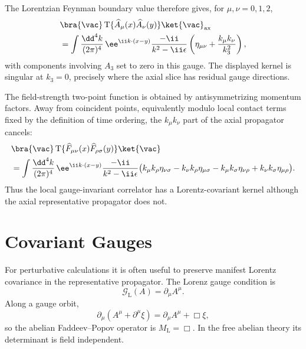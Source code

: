 \begin{corollary}
\label{cor:axial-gauge-field-strength-propagator}
The Lorentzian Feynman boundary value therefore gives, for
\(\mu,\nu=0,1,2\),
\[
\begin{aligned}
  &\bra{\vac}
  \operatorname T\{\widehat A_\mu(x)\widehat A_\nu(y)\}
  \ket{\vac}_{\mathrm{ax}}  \\
  &=
  \int\frac{\dd^4k}{(2\pi)^4}\,
  \ee^{\ii k\cdot(x-y)}
  \frac{-\ii}{k^2-\ii\epsilon}
  \left(
    \eta_{\mu\nu}+\frac{k_\mu k_\nu}{k_3^2}
  \right),
\end{aligned}
\]
with components involving \(A_3\) set to zero in this gauge. The displayed
kernel is singular at \(k_3=0\), precisely where the axial slice has residual
gauge directions.

The field-strength two-point function is obtained by antisymmetrizing
momentum factors. Away from coincident points, equivalently modulo local
contact terms fixed by the definition of time ordering, the \(k_\mu k_\nu\)
part of the axial propagator cancels:
\[
\begin{aligned}
  &\bra{\vac}
  \operatorname T\{
    \widehat F_{\mu\nu}(x)\widehat F_{\rho\sigma}(y)
  \}
  \ket{\vac}  \\
  &=
  \int\frac{\dd^4k}{(2\pi)^4}\,
  \ee^{\ii k\cdot(x-y)}
  \frac{-\ii}{k^2-\ii\epsilon}
  \bigl(
    k_\mu k_\rho\eta_{\nu\sigma}
    -k_\nu k_\rho\eta_{\mu\sigma}
    -k_\mu k_\sigma\eta_{\nu\rho}
    +k_\nu k_\sigma\eta_{\mu\rho}
  \bigr).
\end{aligned}
\]
Thus the local gauge-invariant correlator has a Lorentz-covariant kernel
although the axial representative propagator does not.
\end{corollary}

\section{Covariant Gauges}

\begin{definition}
\label{def:lorenz-gauge-covariant-parameter}
For perturbative calculations it is often useful to preserve manifest
Lorentz covariance in the representative propagator. The Lorenz gauge
condition is
\[
  \mathcal G_{\mathrm L}(A)=\partial_\mu A^\mu .
\]
Along a gauge orbit,
\[
  \partial_\mu(A^\mu+\partial^\mu\xi)
  =
  \partial_\mu A^\mu+\Box\xi,
\]
so the abelian Faddeev--Popov operator is \(M_{\mathrm L}=\Box\). In the
free abelian theory its determinant is field independent.
\end{definition}

